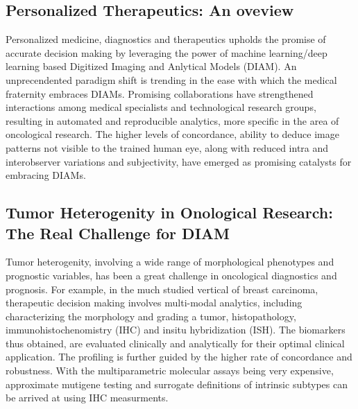 \documentclass[10pt,journal,compsoc]{IEEEtran}
\begin{document}
%
\IEEEpeerreviewmaketitle




\subsection{ Personalized Therapeutics: An oveview}

Personalized medicine, diagnostics and therapeutics upholds the promise of accurate decision making by leveraging the power of machine learning/deep learning based Digitized Imaging and Anlytical Models (DIAM). An unprecendented paradigm shift is trending in the ease with which the medical fraternity embraces DIAMs. Promising collaborations have strengthened interactions among medical specialists and technological research groups, resulting in automated and reproducible analytics, more specific in the area of oncological research. The higher levels of concordance, ability to deduce image patterns not visible to the trained human eye, along with reduced intra and interobserver variations and subjectivity, have emerged as promising catalysts for embracing DIAMs.


\subsection{Tumor Heterogenity in Onological Research: The Real Challenge for DIAM}

Tumor heterogenity, involving a wide range of morphological phenotypes and prognostic variables, has been a great challenge in oncological diagnostics and prognosis. For example, in the much studied vertical of breast carcinoma, therapeutic decision making involves multi-modal analytics, including characterizing the morphology and grading a tumor, histopathology, immunohistochenomistry (IHC) and insitu hybridization (ISH). The biomarkers thus obtained, are evaluated clinically and analytically for their optimal clinical application. The profiling is further guided by the higher rate of concordance and robustness. With the multiparametric molecular assays being very expensive, approximate mutigene testing and surrogate definitions of intrinsic subtypes can be arrived at using IHC measurments.
\end{document}
